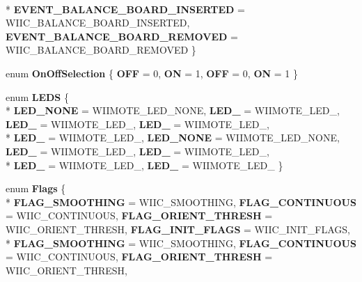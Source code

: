 \begin{DoxyCompactItemize}
\\*
{\bfseries E\-V\-E\-N\-T\-\_\-\-B\-A\-L\-A\-N\-C\-E\-\_\-\-B\-O\-A\-R\-D\-\_\-\-I\-N\-S\-E\-R\-T\-E\-D} =  W\-I\-I\-C\-\_\-\-B\-A\-L\-A\-N\-C\-E\-\_\-\-B\-O\-A\-R\-D\-\_\-\-I\-N\-S\-E\-R\-T\-E\-D, 
{\bfseries E\-V\-E\-N\-T\-\_\-\-B\-A\-L\-A\-N\-C\-E\-\_\-\-B\-O\-A\-R\-D\-\_\-\-R\-E\-M\-O\-V\-E\-D} =  W\-I\-I\-C\-\_\-\-B\-A\-L\-A\-N\-C\-E\-\_\-\-B\-O\-A\-R\-D\-\_\-\-R\-E\-M\-O\-V\-E\-D
 \}
\item 
enum {\bfseries On\-Off\-Selection} \{ {\bfseries O\-F\-F} =  0, 
{\bfseries O\-N} =  1, 
{\bfseries O\-F\-F} =  0, 
{\bfseries O\-N} =  1
 \}
\item 
enum {\bfseries L\-E\-D\-S} \{ \\*
{\bfseries L\-E\-D\-\_\-\-N\-O\-N\-E} =  W\-I\-I\-M\-O\-T\-E\-\_\-\-L\-E\-D\-\_\-\-N\-O\-N\-E, 
{\bfseries L\-E\-D\-\_} =  W\-I\-I\-M\-O\-T\-E\-\_\-\-L\-E\-D\-\_, 
{\bfseries L\-E\-D\-\_} =  W\-I\-I\-M\-O\-T\-E\-\_\-\-L\-E\-D\-\_, 
{\bfseries L\-E\-D\-\_} =  W\-I\-I\-M\-O\-T\-E\-\_\-\-L\-E\-D\-\_, 
\\*
{\bfseries L\-E\-D\-\_} =  W\-I\-I\-M\-O\-T\-E\-\_\-\-L\-E\-D\-\_, 
{\bfseries L\-E\-D\-\_\-\-N\-O\-N\-E} =  W\-I\-I\-M\-O\-T\-E\-\_\-\-L\-E\-D\-\_\-\-N\-O\-N\-E, 
{\bfseries L\-E\-D\-\_} =  W\-I\-I\-M\-O\-T\-E\-\_\-\-L\-E\-D\-\_, 
{\bfseries L\-E\-D\-\_} =  W\-I\-I\-M\-O\-T\-E\-\_\-\-L\-E\-D\-\_, 
\\*
{\bfseries L\-E\-D\-\_} =  W\-I\-I\-M\-O\-T\-E\-\_\-\-L\-E\-D\-\_, 
{\bfseries L\-E\-D\-\_} =  W\-I\-I\-M\-O\-T\-E\-\_\-\-L\-E\-D\-\_
 \}
\item 
enum {\bfseries Flags} \{ \\*
{\bfseries F\-L\-A\-G\-\_\-\-S\-M\-O\-O\-T\-H\-I\-N\-G} =  W\-I\-I\-C\-\_\-\-S\-M\-O\-O\-T\-H\-I\-N\-G, 
{\bfseries F\-L\-A\-G\-\_\-\-C\-O\-N\-T\-I\-N\-U\-O\-U\-S} =  W\-I\-I\-C\-\_\-\-C\-O\-N\-T\-I\-N\-U\-O\-U\-S, 
{\bfseries F\-L\-A\-G\-\_\-\-O\-R\-I\-E\-N\-T\-\_\-\-T\-H\-R\-E\-S\-H} =  W\-I\-I\-C\-\_\-\-O\-R\-I\-E\-N\-T\-\_\-\-T\-H\-R\-E\-S\-H, 
{\bfseries F\-L\-A\-G\-\_\-\-I\-N\-I\-T\-\_\-\-F\-L\-A\-G\-S} =  W\-I\-I\-C\-\_\-\-I\-N\-I\-T\-\_\-\-F\-L\-A\-G\-S, 
\\*
{\bfseries F\-L\-A\-G\-\_\-\-S\-M\-O\-O\-T\-H\-I\-N\-G} =  W\-I\-I\-C\-\_\-\-S\-M\-O\-O\-T\-H\-I\-N\-G, 
{\bfseries F\-L\-A\-G\-\_\-\-C\-O\-N\-T\-I\-N\-U\-O\-U\-S} =  W\-I\-I\-C\-\_\-\-C\-O\-N\-T\-I\-N\-U\-O\-U\-S, 
{\bfseries F\-L\-A\-G\-\_\-\-O\-R\-I\-E\-N\-T\-\_\-\-T\-H\-R\-E\-S\-H} =  W\-I\-I\-C\-\_\-\-O\-R\-I\-E\-N\-T\-\_\-\-T\-H\-R\-E\-S\-H, 

\end{DoxyCompactItemize}

